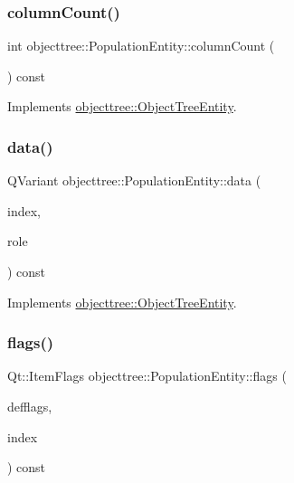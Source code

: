 \subsubsection{\texorpdfstring{columnCount()}{columnCount()}}
{\footnotesize\ttfamily int objecttree\+::\+Population\+Entity\+::column\+Count (\begin{DoxyParamCaption}{ }\end{DoxyParamCaption}) const\hspace{0.3cm}{\ttfamily [virtual]}}



Implements \mbox{\hyperlink{classobjecttree_1_1_object_tree_entity_a70fd25eccf88b305e9db15fbe3daeae8}{objecttree\+::\+Object\+Tree\+Entity}}.

\mbox{\label{classobjecttree_1_1_population_entity_a1b61b36e9dc259bae63cf5cc6427f7c6}} 
\subsubsection{\texorpdfstring{data()}{data()}}
{\footnotesize\ttfamily Q\+Variant objecttree\+::\+Population\+Entity\+::data (\begin{DoxyParamCaption}\item[{const Q\+Model\+Index \&}]{index,  }\item[{int}]{role }\end{DoxyParamCaption}) const\hspace{0.3cm}{\ttfamily [virtual]}}



Implements \mbox{\hyperlink{classobjecttree_1_1_object_tree_entity_a2413c6573de18b451d97eb3800f10f35}{objecttree\+::\+Object\+Tree\+Entity}}.

\mbox{\label{classobjecttree_1_1_population_entity_a9da7b5ae9e92f9690921af7796cbb799}} 
\subsubsection{\texorpdfstring{flags()}{flags()}}
{\footnotesize\ttfamily Qt\+::\+Item\+Flags objecttree\+::\+Population\+Entity\+::flags (\begin{DoxyParamCaption}\item[{Qt\+::\+Item\+Flags}]{defflags,  }\item[{const Q\+Model\+Index \&}]{index }\end{DoxyParamCaption}) const\hspace{0.3cm}{\ttfamily [virtual]}}



